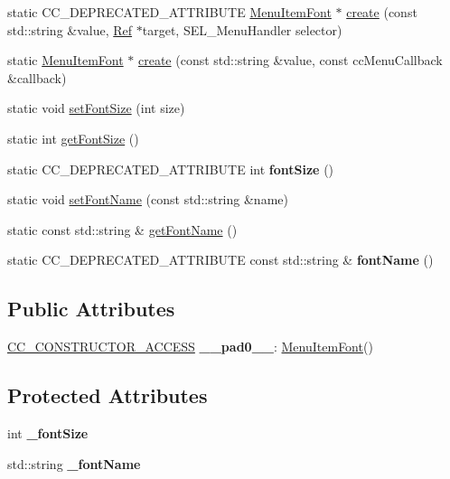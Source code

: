 \begin{DoxyCompactItemize}
static C\+C\+\_\+\+D\+E\+P\+R\+E\+C\+A\+T\+E\+D\+\_\+\+A\+T\+T\+R\+I\+B\+U\+TE \hyperlink{classMenuItemFont}{Menu\+Item\+Font} $\ast$ \hyperlink{classMenuItemFont_a13d8b74a0e1f818a26e55f92b9b91eec}{create} (const std\+::string \&value, \hyperlink{classRef}{Ref} $\ast$target, S\+E\+L\+\_\+\+Menu\+Handler selector)
\item 
static \hyperlink{classMenuItemFont}{Menu\+Item\+Font} $\ast$ \hyperlink{classMenuItemFont_a60f83b22f153da6aade56cdae0b58ce2}{create} (const std\+::string \&value, const cc\+Menu\+Callback \&callback)
\item 
static void \hyperlink{classMenuItemFont_ae322e28b76be4f9c73e24da908c7185b}{set\+Font\+Size} (int size)
\item 
static int \hyperlink{classMenuItemFont_a0dde3b363d155945dd99632f85bd5d5d}{get\+Font\+Size} ()
\item 
\mbox{\label{classMenuItemFont_a23c12f9c180c901873b06b648112cf28}} 
static C\+C\+\_\+\+D\+E\+P\+R\+E\+C\+A\+T\+E\+D\+\_\+\+A\+T\+T\+R\+I\+B\+U\+TE int {\bfseries font\+Size} ()
\item 
static void \hyperlink{classMenuItemFont_a62513d80f81669bd282760ca5003e339}{set\+Font\+Name} (const std\+::string \&name)
\item 
static const std\+::string \& \hyperlink{classMenuItemFont_a51cfd7ebdb3b61c1257a0b9abd826ea9}{get\+Font\+Name} ()
\item 
\mbox{\label{classMenuItemFont_a24c0f6ef0db101c0595b9b67f66fc903}} 
static C\+C\+\_\+\+D\+E\+P\+R\+E\+C\+A\+T\+E\+D\+\_\+\+A\+T\+T\+R\+I\+B\+U\+TE const std\+::string \& {\bfseries font\+Name} ()
\end{DoxyCompactItemize}
\subsection*{Public Attributes}
\begin{DoxyCompactItemize}
\item 
\mbox{\label{classMenuItemFont_a0fe3769222c4e5b1b4f8033ccd9a03cf}} 
\hyperlink{_2cocos2d_2cocos_2base_2ccConfig_8h_a25ef1314f97c35a2ed3d029b0ead6da0}{C\+C\+\_\+\+C\+O\+N\+S\+T\+R\+U\+C\+T\+O\+R\+\_\+\+A\+C\+C\+E\+SS} {\bfseries \+\_\+\+\_\+pad0\+\_\+\+\_\+}\+: \hyperlink{classMenuItemFont}{Menu\+Item\+Font}()
\end{DoxyCompactItemize}
\subsection*{Protected Attributes}
\begin{DoxyCompactItemize}
\item 
\mbox{\label{classMenuItemFont_a1cc9039698e55afbdeefc10e377cc7bb}} 
int {\bfseries \+\_\+font\+Size}
\item 
\mbox{\label{classMenuItemFont_af190f71eb9668c50dc1c8a0df278eaf9}} 
std\+::string {\bfseries \+\_\+font\+Name}
\end{DoxyCompactItemize}
